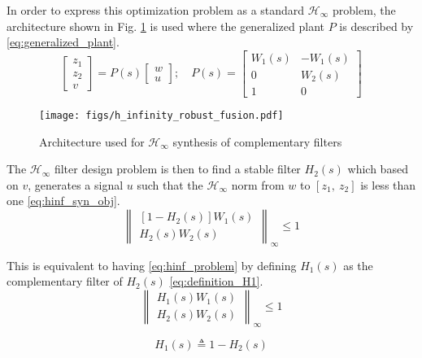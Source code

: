 \documentclass[conference]{IEEEtran}
\begin{document}
In order to express this optimization problem as a standard \(\mathcal{H}_\infty\) problem, the architecture shown in Fig. \ref{fig:h_infinity_robust_fusion} is used where the generalized plant \(P\) is described by \eqref{eq:generalized_plant}.
\begin{equation}
\label{eq:generalized_plant}
  \begin{bmatrix} z_1 \\ z_2 \\ v \end{bmatrix} = P(s) \begin{bmatrix} w\\u \end{bmatrix}; \quad P(s) = \begin{bmatrix}W_1(s) & -W_1(s) \\ 0 & W_2(s) \\  1 & 0 \end{bmatrix}
\end{equation}

\begin{figure}[htbp]
\centering
\texttt{[image: figs/h\_infinity\_robust\_fusion.pdf]}
\caption{\label{fig:h_infinity_robust_fusion}
Architecture used for \(\mathcal{H}_\infty\) synthesis of complementary filters}
\end{figure}

The \(\mathcal{H}_\infty\) filter design problem is then to find a stable filter \(H_2(s)\) which based on \(v\), generates a signal \(u\) such that the \(\mathcal{H}_\infty\) norm from \(w\) to \([z_1, \ z_2]\) is less than one \eqref{eq:hinf_syn_obj}.
\begin{equation}
\label{eq:hinf_syn_obj}
  \left\|\begin{matrix} \left[1 - H_2(s)\right] W_1(s) \\ H_2(s) W_2(s) \end{matrix}\right\|_\infty \le 1
\end{equation}

This is equivalent to having \eqref{eq:hinf_problem} by defining \(H_1(s)\) as the complementary filter of \(H_2(s)\) \eqref{eq:definition_H1}.
\begin{equation}
\label{eq:hinf_problem}
  \left\|\begin{matrix} H_1(s) W_1(s) \\ H_2(s) W_2(s) \end{matrix}\right\|_\infty \le 1
\end{equation}

\begin{equation}
\label{eq:definition_H1}
  H_1(s) \triangleq 1 - H_2(s)
\end{equation}
\end{document}
